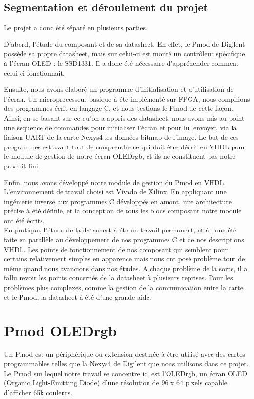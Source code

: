 \documentclass[11pt]{article}
\begin{document}
\subsection{Segmentation et déroulement du projet}

Le projet a donc été séparé en plusieurs parties. 

D'abord, l'étude du composant et de sa datasheet. En effet, le Pmod de Digilent possède sa propre datasheet, mais sur celui-ci est monté un contrôleur spécifique à l'écran OLED : le SSD1331. Il a donc été nécessaire d’appréhender comment celui-ci fonctionnait. 

Ensuite, nous avons élaboré un programme d'initialisation et d'utilisation de l'écran. Un microprocesseur basique à été implémenté sur FPGA, nous compilions des programmes écrit en langage C, et nous testions le Pmod de cette façon. Ainsi, en se basant sur ce qu'on a appris des datasheet, nous avons mis au point une séquence de commandes pour initialiser l'écran et pour lui envoyer, via la liaison UART de la carte Nexys4 les données bitmap de l'image. Le but de ces programmes est avant tout de comprendre ce qui doit être décrit en VHDL pour le module de gestion de notre écran OLEDrgb, et ils ne constituent pas notre produit fini. 

Enfin, nous avons développé notre module de gestion du Pmod en VHDL. L’environnement de travail choisi est Vivado de Xilinx. En appliquant une ingénierie inverse aux programmes C développés en amont, une architecture précise à été définie, et la conception de tous les blocs composant notre module ont été écrits. \\

En pratique, l'étude de la datasheet à été un travail permanent, et à donc été faite en parallèle au développement de nos programmes C et de nos descriptions VHDL. Les points de fonctionnement de nos composant qui semblent pour certains relativement simples en apparence mais nous ont posé problème tout de même quand nous avancions dans nos études. A chaque problème de la sorte, il a fallu revoir les points concernés de la datasheet à plusieurs reprises. Pour les problèmes plus complexes, comme la gestion de la communication entre la carte et le Pmod, la datasheet à été d'une grande aide. 

\section{Pmod OLEDrgb}

Un Pmod est un périphérique ou extension destinée à être utilisé avec des cartes programmables telles que la Nexys4 de Digilent que nous utilisons dans ce projet. Le Pmod sur lequel notre travail se concentre ici est l'OLEDrgb, un écran OLED (Organic Light-Emitting Diode) \cite{oleddef} d'une résolution de 96 x 64 pixels capable d'afficher 65k couleurs. 
\end{document}
